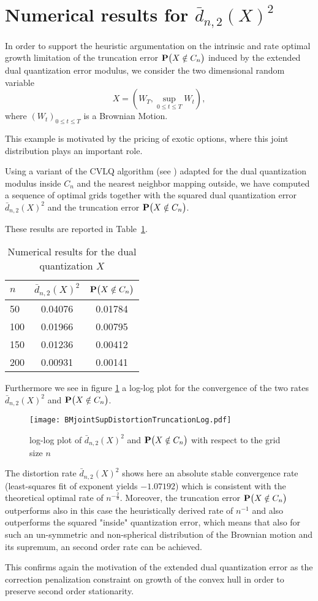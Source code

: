 \section{Numerical results for $\bar d_{n,2}(X)^2$}\label{app:num}
In order to support the heuristic argumentation on the intrinsic and rate optimal growth limitation of the truncation error $\mathbf{P}\big(X\notin C_{n}\big)$ induced by the extended dual quantization error modulus,
we consider the two dimensional random variable 
\[
	X = (W_T, \sup_{0\leq t \leq T}W_t),
\]
where $(W_t)_{0\leq t \leq T}$ is a Brownian Motion.

This example is motivated by the pricing of exotic options, where this joint distribution plays an important role.

Using a variant of the CVLQ algorithm (see \cite{dualStat}) adapted for the dual quantization modulus inside $C_n$ and the nearest neighbor mapping outside, we have computed a sequence of optimal grids together with the squared dual quantization error $\bar d_{n,2}(X)^2$ and the truncation error $\mathbf{P}\big(X\notin C_{n}\big)$.

These results are reported in Table~\ref{tab:num}. 

\begin{table}[h!]
\centering
\label{tab:num}
\caption{Numerical results for the dual quantization $X$}
\begin{tabular}{l|c|c}
$n$ & $\bar d_{n,2}(X)^2$ & $\mathbf{P}\big(X\notin C_{n}\big)$ \\
\hline
50 & 0.04076 & 0.01784\\
100 & 0.01966 & 0.00795 \\
150 & 0.01236 & 0.00412 \\
200 & 0.00931 & 0.00141 \\
\end{tabular}
\end{table}

Furthermore we see in figure \ref{fig:num} a log-log plot for the convergence of the two rates $\bar d_{n,2}(X)^2$ and $\mathbf{P}\big(X\notin C_{n}\big)$.

\begin{figure}[h!]
\texttt{[image: BMjointSupDistortionTruncationLog.pdf]}
\caption{log-log plot of $\bar d_{n,2}(X)^2$ and $\mathbf{P}\big(X\notin C_{n}\big)$ with respect to the grid size $n$}
\label{fig:num}
\end{figure}

The distortion rate $\bar d_{n,2}(X)^2$ shows here an absolute stable convergence rate (least-squares fit of exponent yields $-1.07192$) which is consistent with the theoretical optimal rate of $n^{-\frac{2}{d}}$.
Moreover, the truncation error $\mathbf{P}\big(X\notin C_{n}\big)$ outperforms also in this case the heuristically derived rate of $n^{-1}$ and also outperforms the squared "inside" quantization error, which means that also for such an un-symmetric and non-spherical distribution of the Brownian motion and its supremum, an second order rate can be achieved.

This confirms again the motivation of the extended dual quantization error as the correction penalization constraint on growth of the convex hull in order to preserve second order stationarity.



